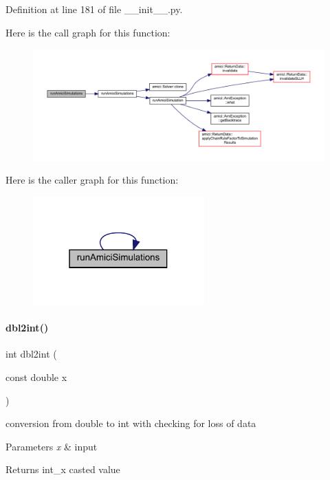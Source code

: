 Definition at line 181 of file \+\_\+\+\_\+init\+\_\+\+\_\+.\+py.

Here is the call graph for this function\+:
\nopagebreak
\begin{figure}[H]
\begin{center}
\leavevmode
\includegraphics[width=350pt]{namespaceamici_a9fcd2221445c4966d12cd57b4b7f688e_cgraph}
\end{center}
\end{figure}
Here is the caller graph for this function\+:
\nopagebreak
\begin{figure}[H]
\begin{center}
\leavevmode
\includegraphics[width=187pt]{namespaceamici_a9fcd2221445c4966d12cd57b4b7f688e_icgraph}
\end{center}
\end{figure}
\mbox{\label{namespaceamici_a204c68962100d0020a37392fef2e95e2}} 
\paragraph{\texorpdfstring{dbl2int()}{dbl2int()}}
{\footnotesize\ttfamily int dbl2int (\begin{DoxyParamCaption}\item[{const double}]{x }\end{DoxyParamCaption})}

conversion from double to int with checking for loss of data 
\begin{DoxyParams}{Parameters}
{\em x} & input \\
\hline
\end{DoxyParams}
\begin{DoxyReturn}{Returns}
int\+\_\+x casted value 
\end{DoxyReturn}



